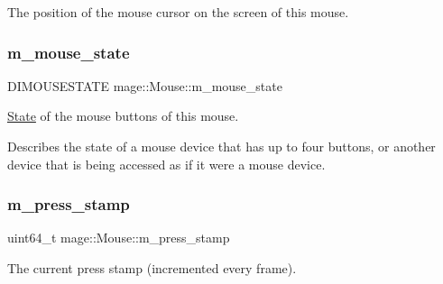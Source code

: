 The position of the mouse cursor on the screen of this mouse. \hypertarget{classmage_1_1_mouse_af99645fb4226077abee4532a5e663066}{}\label{classmage_1_1_mouse_af99645fb4226077abee4532a5e663066} 
\subsubsection{\texorpdfstring{m\+\_\+mouse\+\_\+state}{m\_mouse\_state}}
{\footnotesize\ttfamily D\+I\+M\+O\+U\+S\+E\+S\+T\+A\+TE mage\+::\+Mouse\+::m\+\_\+mouse\+\_\+state\hspace{0.3cm}{\ttfamily [protected]}}

\hyperlink{classmage_1_1_state}{State} of the mouse buttons of this mouse.

Describes the state of a mouse device that has up to four buttons, or another device that is being accessed as if it were a mouse device. \hypertarget{classmage_1_1_mouse_a32b30d3c37a2082869f4ff4f522dfbf8}{}\label{classmage_1_1_mouse_a32b30d3c37a2082869f4ff4f522dfbf8} 
\subsubsection{\texorpdfstring{m\+\_\+press\+\_\+stamp}{m\_press\_stamp}}
{\footnotesize\ttfamily uint64\+\_\+t mage\+::\+Mouse\+::m\+\_\+press\+\_\+stamp\hspace{0.3cm}{\ttfamily [protected]}}

The current press stamp (incremented every frame). 